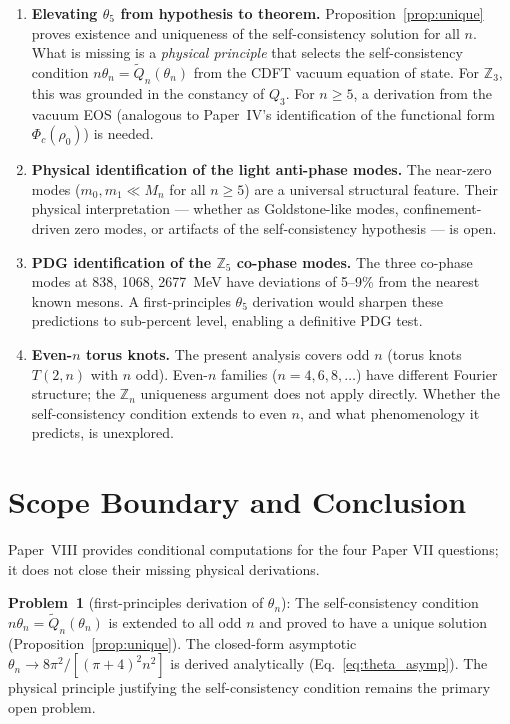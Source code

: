 \documentclass[11pt]{article}
\begin{document}
\begin{enumerate}

\item \textbf{Elevating $\theta_5$ from hypothesis to theorem.}
  Proposition~\ref{prop:unique} proves existence and uniqueness of the
  self-consistency solution for all $n$.
  What is missing is a \emph{physical principle} that selects the
  self-consistency condition $n\theta_n = \widetilde{Q}_n(\theta_n)$
  from the CDFT vacuum equation of state.
  For $\mathbb{Z}_3$, this was grounded in the constancy of $Q_3$.
  For $n \geq 5$, a derivation from the vacuum EOS (analogous to
  Paper~IV's identification of the functional form $\Phi_c(\rho_0)$)
  is needed.

\item \textbf{Physical identification of the light anti-phase modes.}
  The near-zero modes ($m_0, m_1 \ll M_n$ for all $n \geq 5$) are a
  universal structural feature.
  Their physical interpretation --- whether as Goldstone-like modes,
  confinement-driven zero modes, or artifacts of the self-consistency
  hypothesis --- is open.

\item \textbf{PDG identification of the $\mathbb{Z}_5$ co-phase modes.}
  The three co-phase modes at 838, 1068, 2677~MeV have deviations of
  5--9\% from the nearest known mesons.
  A first-principles $\theta_5$ derivation would sharpen these
  predictions to sub-percent level, enabling a definitive PDG test.

\item \textbf{Even-$n$ torus knots.}
  The present analysis covers odd $n$ (torus knots $T(2,n)$ with
  $n$ odd).
  Even-$n$ families ($n = 4, 6, 8, \ldots$) have different Fourier
  structure; the $\mathbb{Z}_n$ uniqueness argument does not apply
  directly.
  Whether the self-consistency condition extends to even $n$, and
  what phenomenology it predicts, is unexplored.

\end{enumerate}


\section{Scope Boundary and Conclusion}

Paper~VIII provides conditional computations for the four Paper VII questions;
it does not close their missing physical derivations.

\textbf{Problem~1} (first-principles derivation of $\theta_n$):
The self-consistency condition $n\theta_n = \widetilde{Q}_n(\theta_n)$ is
extended to all odd $n$ and proved to have a unique solution
(Proposition~\ref{prop:unique}).
The closed-form asymptotic $\theta_n \to 8\pi^2/[(\pi+4)^2 n^2]$
is derived analytically (Eq.~\eqref{eq:theta_asymp}).
The physical principle justifying the self-consistency condition remains the
primary open problem.
\end{document}
